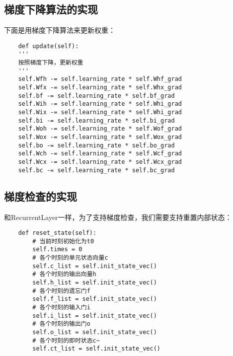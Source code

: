 \subsection{梯度下降算法的实现}\label{Lstm:14}
下面是用梯度下降算法来更新权重：
\begin{lstlisting}
    def update(self):
    '''
    按照梯度下降，更新权重
    '''
    self.Wfh -= self.learning_rate * self.Whf_grad
    self.Wfx -= self.learning_rate * self.Whx_grad
    self.bf -= self.learning_rate * self.bf_grad
    self.Wih -= self.learning_rate * self.Whi_grad
    self.Wix -= self.learning_rate * self.Whi_grad
    self.bi -= self.learning_rate * self.bi_grad
    self.Woh -= self.learning_rate * self.Wof_grad
    self.Wox -= self.learning_rate * self.Wox_grad
    self.bo -= self.learning_rate * self.bo_grad
    self.Wch -= self.learning_rate * self.Wcf_grad
    self.Wcx -= self.learning_rate * self.Wcx_grad
    self.bc -= self.learning_rate * self.bc_grad
\end{lstlisting}





\subsection{梯度检查的实现}\label{Lstm:15}

和RecurrentLayer一样，为了支持梯度检查，我们需要支持重置内部状态：
\begin{lstlisting}
    def reset_state(self):
        # 当前时刻初始化为t0
        self.times = 0       
        # 各个时刻的单元状态向量c
        self.c_list = self.init_state_vec()
        # 各个时刻的输出向量h
        self.h_list = self.init_state_vec()
        # 各个时刻的遗忘门f
        self.f_list = self.init_state_vec()
        # 各个时刻的输入门i
        self.i_list = self.init_state_vec()
        # 各个时刻的输出门o
        self.o_list = self.init_state_vec()
        # 各个时刻的即时状态c~
        self.ct_list = self.init_state_vec()
\end{lstlisting}

